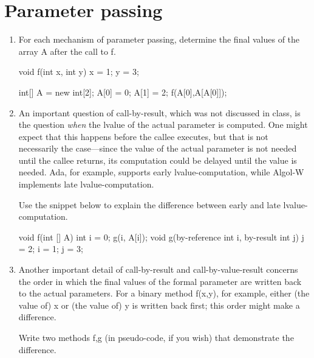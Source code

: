 \documentclass{article}
\begin{document}
\section{Parameter passing}
\begin{enumerate}
\item For each mechanism of parameter passing, determine the final
values of the array \textsf{A} after the call to \textsf{f}. 

\begin{java}
void f(int x, int y) {
    x = 1;
    y = 3;
}

int[] A = new int[2];
A[0] = 0;
A[1] = 2;
f(A[0],A[A[0]]);
\end{java}
\item An important question of call-by-result, which was not discussed in
class, is the question \textit{when} the lvalue of the actual parameter is 
computed. One might expect that this happens before the callee executes,
but that is not necessarily the case---since the value of the actual
parameter is not needed until the 
callee returns, its computation could be delayed until the value is needed.
Ada, for example,  supports early lvalue-computation, while Algol-W implements
late lvalue-computation.

Use the snippet below to explain the difference between early and late
lvalue-computation.
\begin{java}
void f(int [] A) {
   int i = 0;
   g(i, A[i]);
}
void g(by-reference int i, by-result int j) {
   j = 2;
   i = 1;
   j = 3;
}
\end{java}

\item Another important detail of call-by-result and call-by-value-result concerns
the order in which the final values of the formal parameter are written back
to the actual parameters. For a binary method \textsf{f(x,y)}, for
example, either (the value of) \textsf{x} or (the value of) 
\textsf{y} is written back
first; this order might make a difference. 

Write two methods \textsf{f,g} (in pseudo-code,
if you wish) that demonstrate the difference.
\end{enumerate}
\end{document}
